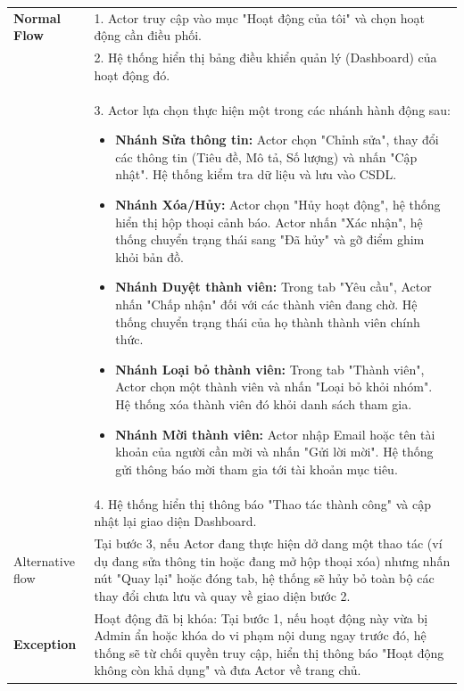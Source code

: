 \begin{xltabular}{\textwidth}{|>{\bfseries}p{3.5cm}|X|}
    \textbf{Normal Flow} & 1. Actor truy cập vào mục "Hoạt động của tôi" và chọn hoạt động cần điều phối. \\
    & 2. Hệ thống hiển thị bảng điều khiển quản lý (Dashboard) của hoạt động đó. \\ 
    & 3. Actor lựa chọn thực hiện một trong các nhánh hành động sau:
    \vspace{0.2cm}
    \begin{itemize}[leftmargin=*, noitemsep]
        \item \textbf{Nhánh Sửa thông tin:} Actor chọn "Chỉnh sửa", thay đổi các thông tin (Tiêu đề, Mô tả, Số lượng) và nhấn "Cập nhật". Hệ thống kiểm tra dữ liệu và lưu vào CSDL.
        \item \textbf{Nhánh Xóa/Hủy:} Actor chọn "Hủy hoạt động", hệ thống hiển thị hộp thoại cảnh báo. Actor nhấn "Xác nhận", hệ thống chuyển trạng thái sang "Đã hủy" và gỡ điểm ghim khỏi bản đồ.
        \item \textbf{Nhánh Duyệt thành viên:} Trong tab "Yêu cầu", Actor nhấn "Chấp nhận" đối với các thành viên đang chờ. Hệ thống chuyển trạng thái của họ thành thành viên chính thức.
        \item \textbf{Nhánh Loại bỏ thành viên:} Trong tab "Thành viên", Actor chọn một thành viên và nhấn "Loại bỏ khỏi nhóm". Hệ thống xóa thành viên đó khỏi danh sách tham gia.
        \item \textbf{Nhánh Mời thành viên:} Actor nhập Email hoặc tên tài khoản của người cần mời và nhấn "Gửi lời mời". Hệ thống gửi thông báo mời tham gia tới tài khoản mục tiêu.
    \end{itemize} \\ 
    & 4. Hệ thống hiển thị thông báo "Thao tác thành công" và cập nhật lại giao diện Dashboard. \\ \hline
    
    Alternative flow & Tại bước 3, nếu Actor đang thực hiện dở dang một thao tác (ví dụ đang sửa thông tin hoặc đang mở hộp thoại xóa) nhưng nhấn nút "Quay lại" hoặc đóng tab, hệ thống sẽ hủy bỏ toàn bộ các thay đổi chưa lưu và quay về giao diện bước 2. \\ \hline
    Exception & Hoạt động đã bị khóa: Tại bước 1, nếu hoạt động này vừa bị Admin ẩn hoặc khóa do vi phạm nội dung ngay trước đó, hệ thống sẽ từ chối quyền truy cập, hiển thị thông báo "Hoạt động không còn khả dụng" và đưa Actor về trang chủ. \\ \hline

\end{xltabular}

